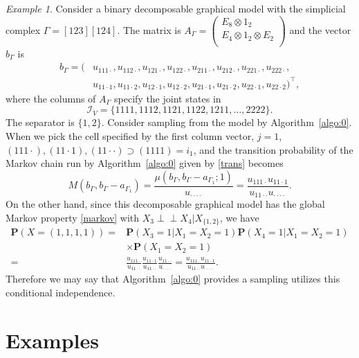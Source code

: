 \documentclass[a4paper,12pt]{article}
\theoremstyle{plain}
\theoremstyle{remark}
\newtheorem{example}[theorem]{Example}
\begin{document}
\begin{example}\label{exam:4cyclet}
  Consider a binary decomposable graphical model with the
  simplicial complex $\Gamma=[123][124]$. The matrix
  is $A_{\Gamma}=\left(
    \begin{array}{c}
    E_8\otimes 1_2\\
    E_4\otimes 1_2\otimes E_2\\
    \end{array}
    \right)$ and the vector $b_{\Gamma}$ is
  \begin{align*}
    b_{\Gamma}=
    (&u_{111\cdot},u_{112\cdot},u_{121\cdot},u_{122\cdot},
      u_{211\cdot},u_{212\cdot},u_{221\cdot},u_{222\cdot},\\
     &u_{11\cdot1},u_{11\cdot2},u_{12\cdot1},u_{12\cdot2},
      u_{21\cdot1}, u_{21\cdot2}, u_{22\cdot1},u_{22\cdot2})^\top,
  \end{align*}
  where the columns of $A_\Gamma$ specify the joint states in
  \[
  \mathcal{I}_V=\{1111, 1112, 1121, 1122, 1211,\ldots, 2222\}.
  \]
  The separator is $\{1,2\}$. Consider sampling from
  the model by Algorithm~\ref{algo:0}. When we
    pick the cell specified by the first column vector, $j=1$,
  $(111\cdot),(11\cdot1),(11\cdot\cdot){\supset}(1111)=i_1$,
  and the transition probability of the Markov chain run
  by Algorithm~\ref{algo:0} given by \eqref{trans} becomes
  \[
  M(b_\Gamma,b_\Gamma-a_{\Gamma_1})=\frac{\mu(b_\Gamma,b_\Gamma-a_{\Gamma_1};1)}
       {u_{\cdot\cdot\cdot\cdot}}=
  \frac{u_{111\cdot}u_{11\cdot1}}{u_{11\cdot\cdot}
        u_{\cdot\cdot\cdot\cdot}}.
  \]
  On the other hand,
  since this decomposable graphical model has the global Markov property \eqref{markov} with $X_3 \perp\!\!\!\perp X_4|X_{\{1,2\}}$, we have
  \begin{align*}
    \mathbf{P}(X=(1,1,1,1))=&
    \mathbf{P}(X_3=1|X_1=X_2=1)\mathbf{P}(X_4=1|X_1=X_2=1)\\
    &\times\mathbf{P}(X_1=X_2=1)\\
    =&\frac{u_{111\cdot}}{u_{11\cdot\cdot}}
      \frac{u_{11\cdot1}}{u_{11\cdot\cdot}}
      \frac{u_{11\cdot\cdot}}{u_{\cdot\cdot\cdot\cdot}}
     =\frac{u_{111\cdot}u_{11\cdot1}}
      {u_{11\cdot\cdot}u_{\cdot\cdot\cdot\cdot}}.
  \end{align*}
  Therefore we may say that
  Algorithm~\ref{algo:0} provides a sampling utilizes this
  conditional independence.
\end{example}

\section{Examples}
\label{sect:examp}
\end{document}
